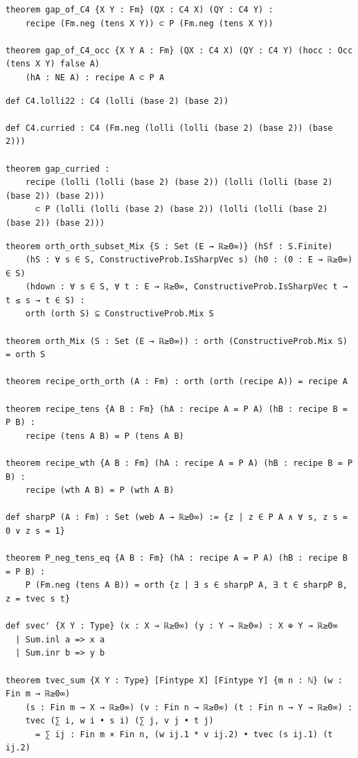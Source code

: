 \label{lean:gap-of-c4}
\begin{lstlisting}
theorem gap_of_C4 {X Y : Fm} (QX : C4 X) (QY : C4 Y) :
    recipe (Fm.neg (tens X Y)) ⊂ P (Fm.neg (tens X Y))

theorem gap_of_C4_occ {X Y A : Fm} (QX : C4 X) (QY : C4 Y) (hocc : Occ (tens X Y) false A)
    (hA : NE A) : recipe A ⊂ P A
\end{lstlisting}

\label{lean:gap-curried}
\begin{lstlisting}
def C4.lolli22 : C4 (lolli (base 2) (base 2))

def C4.curried : C4 (Fm.neg (lolli (lolli (base 2) (base 2)) (base 2)))

theorem gap_curried :
    recipe (lolli (lolli (base 2) (base 2)) (lolli (lolli (base 2) (base 2)) (base 2)))
      ⊂ P (lolli (lolli (base 2) (base 2)) (lolli (lolli (base 2) (base 2)) (base 2)))
\end{lstlisting}

\label{lean:closure}
\begin{lstlisting}
theorem orth_orth_subset_Mix {S : Set (E → ℝ≥0∞)} (hSf : S.Finite)
    (hS : ∀ s ∈ S, ConstructiveProb.IsSharpVec s) (h0 : (0 : E → ℝ≥0∞) ∈ S)
    (hdown : ∀ s ∈ S, ∀ t : E → ℝ≥0∞, ConstructiveProb.IsSharpVec t → t ≤ s → t ∈ S) :
    orth (orth S) ⊆ ConstructiveProb.Mix S

theorem orth_Mix (S : Set (E → ℝ≥0∞)) : orth (ConstructiveProb.Mix S) = orth S

theorem recipe_orth_orth (A : Fm) : orth (orth (recipe A)) = recipe A

theorem recipe_tens {A B : Fm} (hA : recipe A = P A) (hB : recipe B = P B) :
    recipe (tens A B) = P (tens A B)

theorem recipe_wth {A B : Fm} (hA : recipe A = P A) (hB : recipe B = P B) :
    recipe (wth A B) = P (wth A B)

def sharpP (A : Fm) : Set (web A → ℝ≥0∞) := {z | z ∈ P A ∧ ∀ s, z s = 0 ∨ z s = 1}

theorem P_neg_tens_eq {A B : Fm} (hA : recipe A = P A) (hB : recipe B = P B) :
    P (Fm.neg (tens A B)) = orth {z | ∃ s ∈ sharpP A, ∃ t ∈ sharpP B, z = tvec s t}

def svec' {X Y : Type} (x : X → ℝ≥0∞) (y : Y → ℝ≥0∞) : X ⊕ Y → ℝ≥0∞
  | Sum.inl a => x a
  | Sum.inr b => y b

theorem tvec_sum {X Y : Type} [Fintype X] [Fintype Y] {m n : ℕ} (w : Fin m → ℝ≥0∞)
    (s : Fin m → X → ℝ≥0∞) (v : Fin n → ℝ≥0∞) (t : Fin n → Y → ℝ≥0∞) :
    tvec (∑ i, w i • s i) (∑ j, v j • t j)
      = ∑ ij : Fin m × Fin n, (w ij.1 * v ij.2) • tvec (s ij.1) (t ij.2)
\end{lstlisting}

